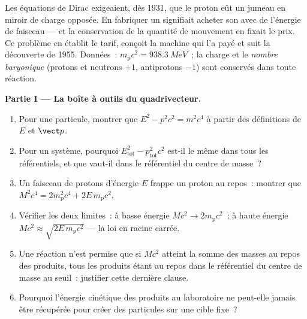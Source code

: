 \begin{problem}\label{pb:b3:relativistic-dynamics:1}
Les équations de Dirac exigeaient, dès 1931, que le proton eût un
jumeau en miroir de charge opposée. En fabriquer un signifiait acheter
son  avec de l'énergie de faisceau --- et la
conservation de la quantité de mouvement en fixait le prix. Ce problème
en établit le tarif, conçoit la machine qui l'a payé et suit la
découverte de 1955. Données~: $m_{\text{p}}c^2 = \qty{938.3}{MeV}$~; la
charge et le \emph{nombre baryonique} (protons et neutrons $+1$,
antiprotons $-1$) sont conservés dans toute réaction.

\medskip\noindent\textbf{Partie I --- La boîte à outils du quadrivecteur.}
\begin{enumerate}
  \item Pour une particule, montrer que $E^2 - p^2c^2 = m^2c^4$ à
        partir des définitions de $E$ et $\vect p$.
  \item Pour un système, pourquoi $E_{\text{tot}}^2 -
        p_{\text{tot}}^2c^2$ est-il le même dans tous les
        référentiels, et que vaut-il dans le référentiel du centre de
        masse~?
  \item Un faisceau de protons d'énergie $E$ frappe un proton au
        repos~: montrer que
        $M^2c^4 = 2m_{\text{p}}^2c^4 + 2E\,m_{\text{p}}c^2$.
  \item Vérifier les deux limites~: à basse énergie $Mc^2 \to
        2m_{\text{p}}c^2$~; à haute énergie $Mc^2 \approx
        \sqrt{2E\,m_{\text{p}}c^2}$ --- la loi en racine carrée.
  \item Une réaction n'est permise que si $Mc^2$ atteint la somme des
        masses au repos des produits, tous les produits étant au repos
        dans le référentiel du centre de masse au seuil~: justifier
        cette dernière clause.
  \item Pourquoi l'énergie cinétique des produits au laboratoire ne
        peut-elle jamais être récupérée pour créer des particules sur
        une cible fixe~?
\end{enumerate}


\end{problem}
